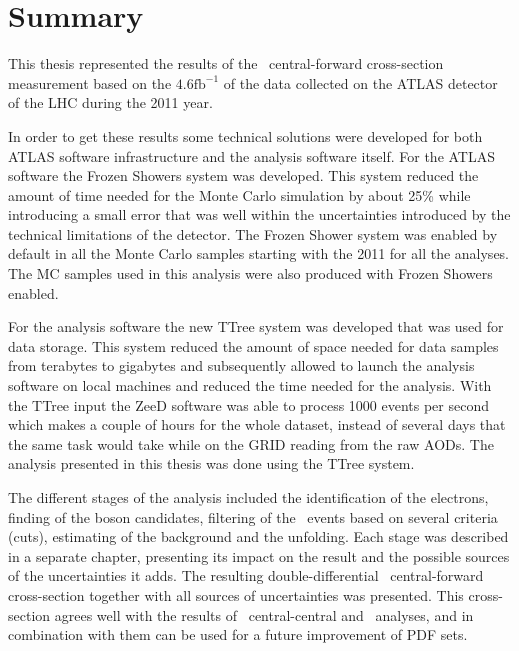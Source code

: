 \chapter{Summary}
\label{sec:Summary}

This thesis represented the results of the \Zee\ central-forward cross-section measurement based on the $4.6 \mathrm{fb}^{-1}$ of the data collected on the ATLAS detector of the LHC during the 2011 year.

In order to get these results some technical solutions were developed for both ATLAS software infrastructure and the analysis software itself. For the ATLAS software the Frozen Showers system was developed. This system reduced the amount of time needed for the Monte Carlo simulation by about 25\% while introducing a small error that was well within the uncertainties introduced by the technical limitations of the detector. The Frozen Shower system was enabled by default in all the Monte Carlo samples starting with the 2011 for all the analyses. The MC samples used in this analysis were also produced with Frozen Showers enabled.

For the analysis software the new TTree system was developed that was used for data storage. This system reduced the amount of space needed for data samples from terabytes to gigabytes and subsequently allowed to launch the analysis software on local machines and reduced the time needed for the analysis. With the TTree input the ZeeD software was able to process 1000 events per second which makes a couple of hours for the whole dataset, instead of several days that the same task would take while on the GRID reading from the raw AODs. The analysis presented in this thesis was done using the TTree system.

The different stages of the analysis included the identification of the electrons, finding of the boson candidates, filtering of the \Zee\ events based on several criteria (cuts), estimating of the background and the unfolding. Each stage was described in a separate chapter, presenting its impact on the result and the possible sources of the uncertainties it adds. The resulting double-differential \Zee\ central-forward cross-section  together with all sources of uncertainties was presented. This cross-section agrees well with the results of \Zee\ central-central and \Zmm\ analyses, and in combination with them can be used for a future improvement of PDF sets.
